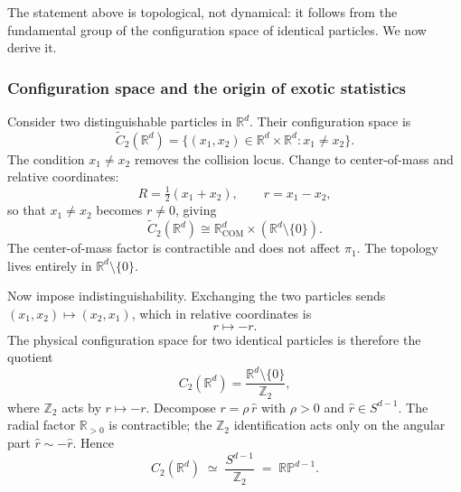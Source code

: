 The statement above is topological, not dynamical: it follows from the fundamental group of the configuration space of identical particles.  We now derive it.

\subsubsection*{Configuration space and the origin of exotic statistics}

Consider two distinguishable particles in $\mathbb{R}^d$.  Their configuration space is
\begin{equation}
  \widetilde{C}_2(\mathbb{R}^d)
  = \{(x_1, x_2) \in \mathbb{R}^d \times \mathbb{R}^d : x_1 \neq x_2\}.
  \label{eq:config-distinguishable}
\end{equation}
The condition $x_1 \neq x_2$ removes the collision locus.  Change to center-of-mass and relative coordinates:
\begin{equation}
  R = \tfrac{1}{2}(x_1 + x_2), \qquad r = x_1 - x_2,
\end{equation}
so that $x_1 \neq x_2$ becomes $r \neq 0$, giving
\begin{equation}
  \widetilde{C}_2(\mathbb{R}^d) \cong \mathbb{R}^d_{\mathrm{COM}} \times (\mathbb{R}^d \setminus \{0\}).
\end{equation}
The center-of-mass factor is contractible and does not affect $\pi_1$.  The topology lives entirely in $\mathbb{R}^d \setminus \{0\}$.

Now impose indistinguishability.  Exchanging the two particles sends $(x_1, x_2) \mapsto (x_2, x_1)$, which in relative coordinates is
\begin{equation}
  r \longmapsto -r.
\end{equation}
The physical configuration space for two identical particles is therefore the quotient
\begin{equation}
  C_2(\mathbb{R}^d)
  = \frac{\mathbb{R}^d \setminus \{0\}}{\mathbb{Z}_2},
  \label{eq:config-identical}
\end{equation}
where $\mathbb{Z}_2$ acts by $r \mapsto -r$.  Decompose $r = \rho\,\hat{r}$ with $\rho > 0$ and $\hat{r} \in S^{d-1}$.  The radial factor $\mathbb{R}_{>0}$ is contractible; the $\mathbb{Z}_2$ identification acts only on the angular part $\hat{r} \sim -\hat{r}$.  Hence
\begin{equation}
  \boxed{
  C_2(\mathbb{R}^d) \;\simeq\; \frac{S^{d-1}}{\mathbb{Z}_2}
  \;=\; \mathbb{RP}^{d-1}.
  }
  \label{eq:config-rp}
\end{equation}

